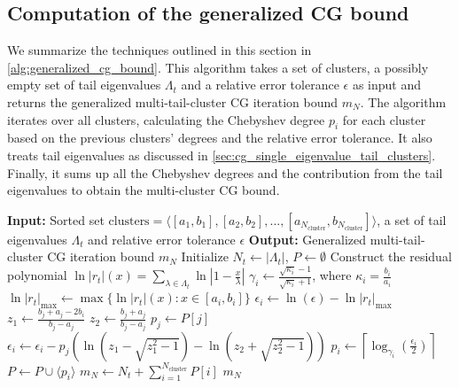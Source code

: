 \subsection{Computation of the generalized CG bound}\label{sec:cg_multi_cluster_bound_algorithm}
We summarize the techniques outlined in this section in \cref{alg:generalized_cg_bound}. This algorithm takes a set of clusters, a possibly empty set of tail eigenvalues $\Lambda_t$ and a relative error tolerance $\epsilon$ as input and returns the generalized multi-tail-cluster CG iteration bound $m_N$. The algorithm iterates over all clusters, calculating the Chebyshev degree $p_i$ for each cluster based on the previous clusters' degrees and the relative error tolerance. It also treats tail eigenvalues as discussed in \cref{sec:cg_single_eigenvalue_tail_clusters}. Finally, it sums up all the Chebyshev degrees and the contribution from the tail eigenvalues to obtain the multi-cluster CG bound.
\begin{algorithm}[H]
    \caption{$\operatorname{GeneralizedCGIterationBound}(\text{clusters}, \Lambda_t, \epsilon)$}
    \begin{algorithmic}[1]
        \State \textbf{Input:} Sorted set $\text{clusters} = \langle[a_1, b_1], [a_2, b_2], \ldots, [a_{N_{\text{cluster}}}, b_{N_{\text{cluster}}}]\rangle$, a set of tail eigenvalues $\Lambda_t$ and relative error tolerance $\epsilon$
        \State \textbf{Output:} Generalized multi-tail-cluster CG iteration bound $m_N$
        \State Initialize $N_{t} \gets |\Lambda_{t}|$, $P \gets \emptyset$
        \State Construct the residual polynomial $\ln|r_{t}|(x) = \sum_{\lambda\in\Lambda_{t}} \ln\left|1 - \frac{x}{\lambda}\right|$
        \State $\gamma_i \gets \frac{\sqrt{\kappa_i} - 1}{\sqrt{\kappa_i} + 1}$, where $\kappa_i = \frac{b_i}{a_i}$
        \State $\ln|r_{t}|_{\text{max}} \gets \max\{\ln|r_{t}|(x) : x \in [a_i, b_i]\}$
        \State $\epsilon_i \gets \ln(\epsilon) - \ln|r_{t}|_{\text{max}}$
         
        \State $z_1 \gets \frac{b_j + a_j - 2b_i}{b_j - a_j}$
        \State $z_2 \gets \frac{b_j + a_j}{b_j - a_j}$
        \State $p_j \gets P[j]$
        \State $\epsilon_i \gets \epsilon_i - p_j \left(\ln\left(z_1 - \sqrt{z_1^2 -1}\right) - \ln\left(z_2 + \sqrt{z_2^2 -1}\right)\right)$
        \EndFor
        \State $p_i \gets \left\lceil\log_{\gamma_i}\left(\frac{\epsilon_i}{2}\right)\right\rceil$
        \State $P \gets P \cup \langle p_i \rangle$
        \EndFor
        \State $m_{N} \gets N_{t} + \sum_{i=1}^{N_{\text{cluster}}} P[i]$
        \State \Return $m_{N}$
    \end{algorithmic}
    \label{alg:generalized_cg_bound}
\end{algorithm}

